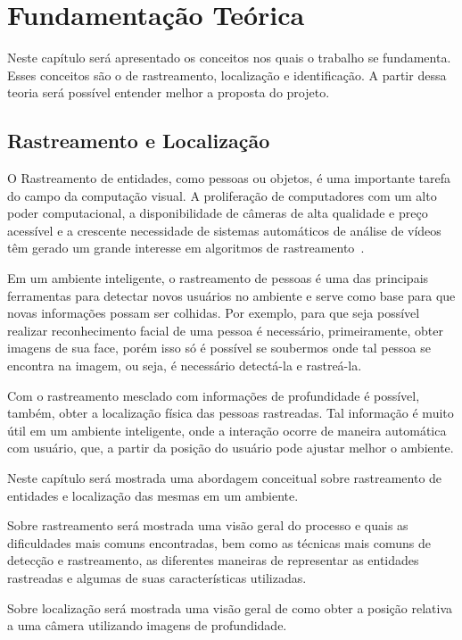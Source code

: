 \chapter{Fundamentação Teórica}

	Neste capítulo será apresentado os conceitos nos quais o trabalho se fundamenta. Esses conceitos são o de rastreamento, localização e identificação. A partir dessa teoria será possível entender melhor a proposta do projeto.


\section{Rastreamento e Localização}

	O Rastreamento de entidades, como pessoas ou objetos, é uma importante tarefa do campo da computação visual. A proliferação de computadores com um alto poder computacional, a disponibilidade de câmeras de alta qualidade e preço acessível e a crescente necessidade de sistemas automáticos de análise de vídeos têm gerado um grande interesse em algoritmos de rastreamento~\cite{yilmaz}.

	Em um ambiente inteligente, o rastreamento de pessoas é uma das principais ferramentas para detectar novos usuários no ambiente e serve como base para que novas informações possam ser colhidas. Por exemplo, para que seja possível realizar reconhecimento facial de uma pessoa é necessário, primeiramente, obter imagens de sua face, porém isso só é possível se soubermos onde tal pessoa se encontra na imagem, ou seja, é necessário detectá-la e rastreá-la.

	Com o rastreamento mesclado com informações de profundidade é possível, também, obter a localização física das pessoas rastreadas. Tal informação é muito útil em um ambiente inteligente, onde a interação ocorre de maneira automática com usuário, que, a partir da posição do usuário pode ajustar melhor o ambiente.

	Neste capítulo será mostrada uma abordagem conceitual sobre rastreamento de entidades e localização das mesmas em um ambiente.

	Sobre rastreamento será mostrada uma visão geral do processo e quais as dificuldades mais comuns encontradas, bem como as técnicas mais comuns de detecção e rastreamento, as diferentes maneiras de representar as entidades rastreadas e algumas de suas características utilizadas.

	Sobre localização será mostrada uma visão geral de como obter a posição relativa a uma câmera utilizando imagens de profundidade.

